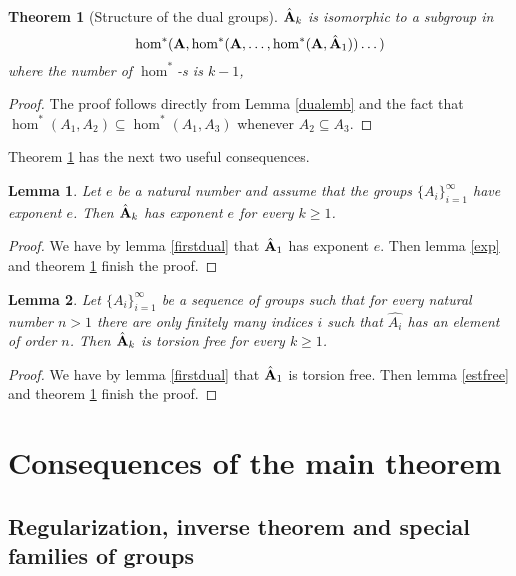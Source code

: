 \documentclass [11pt] {article}
\newtheorem{lemma}{Lemma}[section]
\newtheorem{theorem}{Theorem}
\def\bA{{\bf A}}
\begin{document}
\begin{theorem}[Structure of the dual groups]\label{dualstruct} $\hat{\bA}_k$ is isomorphic to a subgroup in
$$\hom^*(\bA,\hom^*(\bA,\dots,\hom^*(\bA,\hat{\bA}_1))\dots)$$
where the number of $\hom^*$-s is $k-1$,
\end{theorem}

\begin{proof} The proof follows directly from Lemma \ref{dualemb} and the fact that $\hom^*(A_1,A_2)\subseteq \hom^*(A_1,A_3)$ whenever $A_2\subseteq A_3$.
\end{proof}

Theorem \ref{dualstruct} has the next two useful consequences.

\begin{lemma}\label{duexp} Let $e$ be a natural number and assume that the groups $\{A_i\}_{i=1}^\infty$ have exponent $e$. Then $\hat{\bA}_k$ has exponent $e$ for every $k\geq 1$.
\end{lemma}

\begin{proof} We have by lemma \ref{firstdual} that $\hat{\bA}_1$ has exponent $e$. Then lemma \ref{exp} and theorem \ref{dualstruct} finish the proof.
\end{proof}

\begin{lemma}\label{charzero} Let  $\{A_i\}_{i=1}^\infty$ be a sequence of groups such that for every natural number $n>1$  there are only finitely many indices $i$ such that $\hat{A_i}$ has an element of order $n$. Then $\hat{\bA}_k$ is torsion free for every $k\geq 1$. 
\end{lemma}

\begin{proof} We have by lemma \ref{firstdual} that $\hat{\bA}_1$ is torsion free. Then lemma \ref{estfree} and theorem \ref{dualstruct} finish the proof.
\end{proof}

\section{Consequences of the main theorem}

\subsection{Regularization, inverse theorem and special families of groups} 

\bigskip
\end{document}

